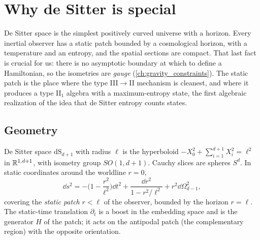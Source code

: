 \section{Why de Sitter is special}\label{ch:ds_special}

\begin{physmotiv}
De Sitter space is the simplest positively curved universe with a horizon. Every inertial observer has a static patch bounded by a cosmological horizon, with a temperature and an entropy, and the spatial sections are compact. That last fact is crucial for us: there is no asymptotic boundary at which to define a Hamiltonian, so the isometries are \emph{gauge} (\cref{ch:gravity_constraints}). The static patch is the place where the type III$\to$II mechanism is cleanest, and where it produces a type II$_1$ algebra with a maximum-entropy state, the first algebraic realization of the idea that de Sitter entropy counts states.
\end{physmotiv}

\subsection{Geometry}

De Sitter space $\mathrm{dS}_{d+1}$ with radius $\ell$ is the hyperboloid $-X_0^2+\sum_{i=1}^{d+1}X_i^2=\ell^2$ in $\mathbb{R}^{1,d+1}$, with isometry group $SO(1,d+1)$. Cauchy slices are spheres $S^d$. In static coordinates around the worldline $r=0$,
\begin{equation}
\dd s^2=-\Big(1-\frac{r^2}{\ell^2}\Big)\dd t^2+\frac{\dd r^2}{1-r^2/\ell^2}+r^2\dd\Omega_{d-1}^2,
\end{equation}
covering the \emph{static patch} $r<\ell$ of the observer, bounded by the horizon $r=\ell$. The static-time translation $\partial_t$ is a boost in the embedding space and is the generator $H$ of the patch; it acts on the antipodal patch (the complementary region) with the opposite orientation.

